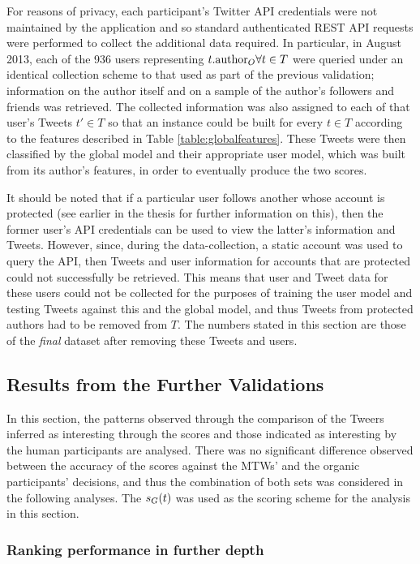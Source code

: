 For reasons of privacy, each participant's Twitter API credentials were not maintained by the application and so standard authenticated REST API requests were performed to collect the additional data required. In particular, in August 2013, each of the 936 users representing $t.\textrm{author}_O \forall t \in T$ were queried under an identical collection scheme to that used as part of the previous validation; information on the author itself and on a sample of the author's followers and friends was retrieved. The collected information was also assigned to each of that user's Tweets $t' \in T$ so that an instance could be built for every $t \in T$ according to the features described in Table \ref{table:globalfeatures}. These Tweets were then classified by the global model and their appropriate user model, which was built from its author's features, in order to eventually produce the two scores. 

It should be noted that if a particular user follows another whose account is protected (see earlier in the thesis for further information on this), then the former user's API credentials can be used to view the latter's information and Tweets. However, since, during the data-collection, a static account was used to query the API, then Tweets and user information for accounts that are protected could not successfully be retrieved. This means that user and Tweet data for these users could not be collected for the purposes of training the user model and testing Tweets against this and the global model, and thus Tweets from protected authors had to be removed from $T$. The numbers stated in this section are those of the \textit{final} dataset after removing these Tweets and users.


\subsection{Results from the Further Validations}
In this section, the patterns observed through the comparison of the Tweers inferred as interesting through the scores and those indicated as interesting by the human participants are analysed. There was no significant difference observed between the accuracy of the scores against the MTWs' and the organic participants' decisions, and thus the combination of both sets was considered in the following analyses. The $s_G(t)$ was used as the scoring scheme for the analysis in this section.

\subsubsection{Ranking performance in further depth}

